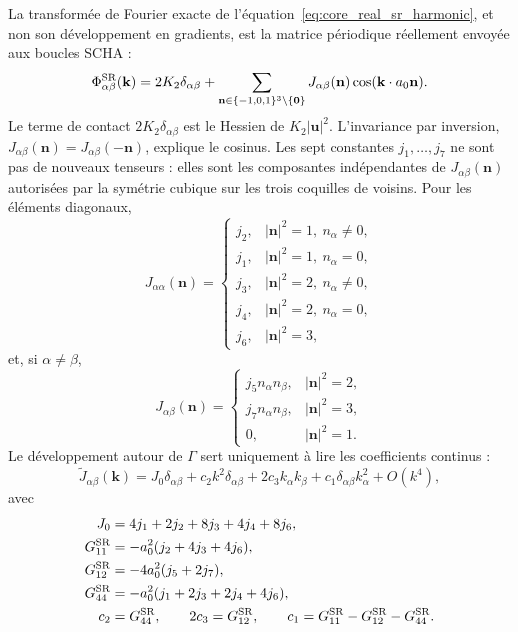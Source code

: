 La transformée de Fourier exacte de
l'équation~\eqref{eq:core_real_sr_harmonic}, et non son développement en
gradients, est la matrice périodique réellement envoyée aux boucles SCHA :
\begin{equation}
\Phi^{\rm SR}_{\alpha\beta}(\mathbf k)
=2K_2\delta_{\alpha\beta}
+\sum_{\mathbf n\in\{-1,0,1\}^3\setminus\{\mathbf0\}}
J_{\alpha\beta}(\mathbf n)
\cos(\mathbf k\cdot a_0\mathbf n).
\label{eq:core_full_sr_kernel}
\end{equation}
Le terme de contact $2K_2\delta_{\alpha\beta}$ est le Hessien de
$K_2|\mathbf u|^2$. L'invariance par inversion,
$J_{\alpha\beta}(\mathbf n)=J_{\alpha\beta}(-\mathbf n)$, explique le cosinus.
Les sept constantes $j_1,\ldots,j_7$ ne sont pas de nouveaux tenseurs : elles
sont les composantes indépendantes de $J_{\alpha\beta}(\mathbf n)$ autorisées
par la symétrie cubique sur les trois coquilles de voisins. Pour les éléments
diagonaux,
\begin{equation}
J_{\alpha\alpha}(\mathbf n)=
\begin{cases}
j_2,&|\mathbf n|^2=1,\ n_\alpha\ne0,\\
j_1,&|\mathbf n|^2=1,\ n_\alpha=0,\\
j_3,&|\mathbf n|^2=2,\ n_\alpha\ne0,\\
j_4,&|\mathbf n|^2=2,\ n_\alpha=0,\\
j_6,&|\mathbf n|^2=3,
\end{cases}
\label{eq:core_sr_diagonal_shells}
\end{equation}
et, si $\alpha\ne\beta$,
\begin{equation}
J_{\alpha\beta}(\mathbf n)=
\begin{cases}
j_5n_\alpha n_\beta,&|\mathbf n|^2=2,\\
j_7n_\alpha n_\beta,&|\mathbf n|^2=3,\\
0,&|\mathbf n|^2=1.
\end{cases}
\label{eq:core_sr_offdiagonal_shells}
\end{equation}
Le développement autour de $\Gamma$ sert uniquement à lire les coefficients
continus :
\begin{equation}
\widetilde J_{\alpha\beta}(\mathbf k)
=J_0\delta_{\alpha\beta}
+c_2k^2\delta_{\alpha\beta}
+2c_3k_\alpha k_\beta
+c_1\delta_{\alpha\beta}k_\alpha^2+O(k^4),
\label{eq:core_sr_small_k}
\end{equation}
avec
\begin{equation}
\begin{aligned}
J_0&=4j_1+2j_2+8j_3+4j_4+8j_6,\\
G_{11}^{\rm SR}&=-a_0^2(j_2+4j_3+4j_6),\\
G_{12}^{\rm SR}&=-4a_0^2(j_5+2j_7),\\
G_{44}^{\rm SR}&=-a_0^2(j_1+2j_3+2j_4+4j_6),\\
c_2&=G_{44}^{\rm SR},\qquad
2c_3=G_{12}^{\rm SR},\qquad
c_1=G_{11}^{\rm SR}-G_{12}^{\rm SR}-G_{44}^{\rm SR}.
\end{aligned}
\label{eq:core_sr_coefficients}
\end{equation}
